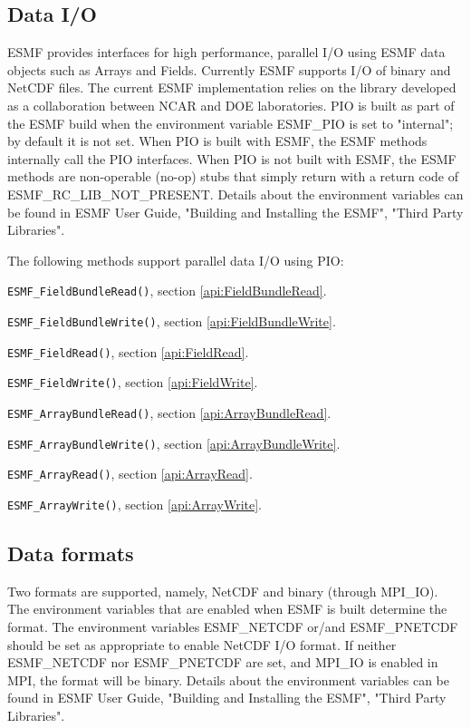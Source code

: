 \subsection{Data I/O}
\label{io:dataio}

\begin{sloppypar}
ESMF provides interfaces for high performance, parallel I/O using ESMF data
objects such as Arrays and Fields.  Currently ESMF supports I/O of binary and
NetCDF files.  The current ESMF implementation relies on the 
library developed as a collaboration between NCAR and DOE laboratories.  PIO
is built as part of the ESMF build when the environment variable ESMF\_PIO is
set to "internal"; by default it is not set. When PIO is built with ESMF, the
ESMF methods internally call the PIO interfaces.  When PIO is not built with
ESMF, the ESMF methods are non-operable (no-op) stubs that simply return with
a return code of ESMF\_RC\_LIB\_NOT\_PRESENT.  Details about the environment
variables can be found in ESMF User Guide, "Building and Installing the ESMF",
"Third Party Libraries".
\end{sloppypar}

The following methods support parallel data I/O using PIO:

\begin{description}
\item {\tt ESMF\_FieldBundleRead()}, section \ref{api:FieldBundleRead}.
\item {\tt ESMF\_FieldBundleWrite()}, section \ref{api:FieldBundleWrite}.
\item {\tt ESMF\_FieldRead()}, section \ref{api:FieldRead}.
\item {\tt ESMF\_FieldWrite()}, section \ref{api:FieldWrite}.
\item {\tt ESMF\_ArrayBundleRead()}, section \ref{api:ArrayBundleRead}.
\item {\tt ESMF\_ArrayBundleWrite()}, section \ref{api:ArrayBundleWrite}.
\item {\tt ESMF\_ArrayRead()}, section \ref{api:ArrayRead}.
\item {\tt ESMF\_ArrayWrite()}, section \ref{api:ArrayWrite}.
\end{description}


\subsection{Data formats}

Two formats are supported, namely, NetCDF and binary (through MPI\_IO). 
The environment variables that are enabled when ESMF is built determine the 
format.  The environment variables ESMF\_NETCDF or/and ESMF\_PNETCDF should be 
set as appropriate to enable NetCDF I/O format.  If neither ESMF\_NETCDF nor
ESMF\_PNETCDF are set, and MPI\_IO is enabled in MPI, the format will be 
binary.  Details about the environment variables can be found in ESMF User 
Guide, "Building and Installing the ESMF", "Third Party Libraries".

